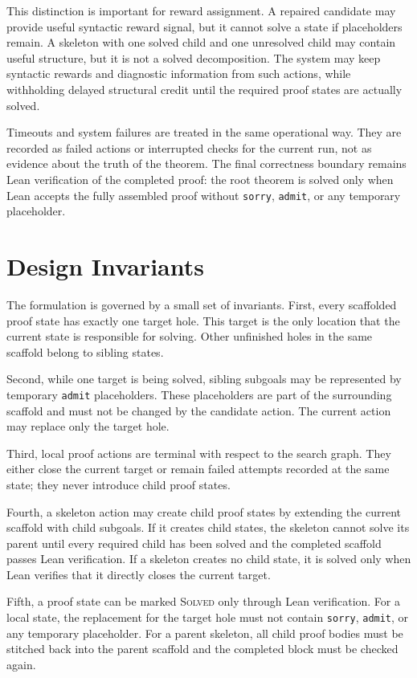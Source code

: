 \documentclass[en]{uet_awesome_thesis/uet-awesome-thesis}
\begin{document}
This distinction is important for reward assignment. A repaired candidate may provide useful syntactic reward signal, but it cannot solve a state if placeholders remain. A skeleton with one solved child and one unresolved child may contain useful structure, but it is not a solved decomposition. The system may keep syntactic rewards and diagnostic information from such actions, while withholding delayed structural credit until the required proof states are actually solved.

Timeouts and system failures are treated in the same operational way. They are recorded as failed actions or interrupted checks for the current run, not as evidence about the truth of the theorem. The final correctness boundary remains Lean verification of the completed proof: the root theorem is solved only when Lean accepts the fully assembled proof without \texttt{sorry}, \texttt{admit}, or any temporary placeholder.

\section{Design Invariants}

The formulation is governed by a small set of invariants. First, every scaffolded proof state has exactly one target hole. This target is the only location that the current state is responsible for solving. Other unfinished holes in the same scaffold belong to sibling states.

Second, while one target is being solved, sibling subgoals may be represented by temporary \texttt{admit} placeholders. These placeholders are part of the surrounding scaffold and must not be changed by the candidate action. The current action may replace only the target hole.

Third, local proof actions are terminal with respect to the search graph. They either close the current target or remain failed attempts recorded at the same state; they never introduce child proof states.

Fourth, a skeleton action may create child proof states by extending the current scaffold with child subgoals. If it creates child states, the skeleton cannot solve its parent until every required child has been solved and the completed scaffold passes Lean verification. If a skeleton creates no child state, it is solved only when Lean verifies that it directly closes the current target.

Fifth, a proof state can be marked \textsc{Solved} only through Lean verification. For a local state, the replacement for the target hole must not contain \texttt{sorry}, \texttt{admit}, or any temporary placeholder. For a parent skeleton, all child proof bodies must be stitched back into the parent scaffold and the completed block must be checked again.
\end{document}
